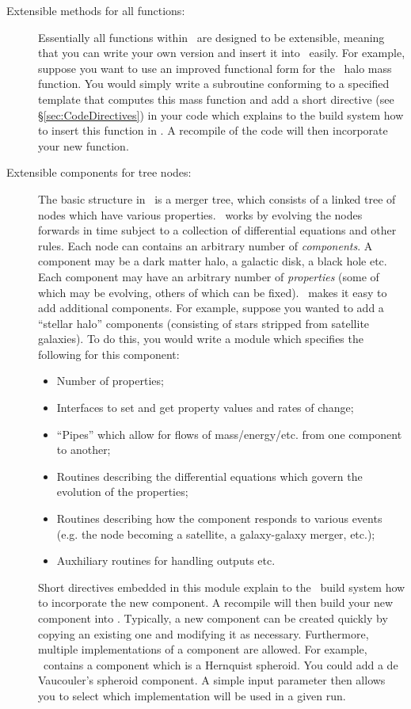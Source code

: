 \begin{description}
 \item [Extensible methods for all functions:] Essentially all functions within \glc\ are designed to be extensible, meaning that you can write your own version and insert it into \glc\ easily. For example, suppose you want to use an improved functional form for the \CDM\ halo mass function. You would simply write a subroutine conforming to a specified template that computes this mass function and add a short directive (see \S\ref{sec:CodeDirectives}) in your code which explains to the build system how to insert this function in \glc. A recompile of the code will then incorporate your new function.

 \item [Extensible components for tree nodes:] The basic structure in \glc\ is a merger tree, which consists of a linked tree of nodes which have various properties. \glc\ works by evolving the nodes forwards in time subject to a collection of differential equations and other rules. Each node can contains an arbitrary number of \emph{components}. A component may be a dark matter halo, a galactic disk, a black hole etc. Each component may have an arbitrary number of \emph{properties} (some of which may be evolving, others of which can be fixed). \glc\ makes it easy to add additional components. For example, suppose you wanted to add a ``stellar halo'' components (consisting of stars stripped from satellite galaxies). To do this, you would write a module which specifies the following for this component:
 \begin{itemize}
  \item Number of properties;
  \item Interfaces to set and get property values and rates of change;
  \item ``Pipes'' which allow for flows of mass/energy/etc. from one component to another;
  \item Routines describing the differential equations which govern the evolution of the properties;
  \item Routines describing how the component responds to various events (e.g. the node becoming a satellite, a galaxy-galaxy merger, etc.);
  \item Auxhiliary routines for handling outputs etc.
 \end{itemize}
 Short directives embedded in this module explain to the \glc\ build system how to incorporate the new component. A recompile will then build your new component into \glc. Typically, a new component can be created quickly by copying an existing one and modifying it as necessary. Furthermore, multiple implementations of a component are allowed. For example, \glc\ contains a component which is a Hernquist spheroid. You could add a de Vaucouler's spheroid component. A simple input parameter then allows you to select which implementation will be used in a given run.


\end{description}
